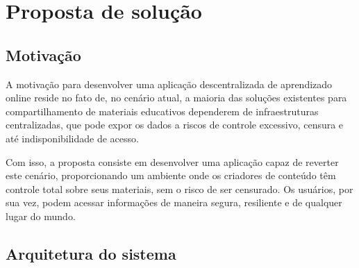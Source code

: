 \chapter[Proposta de solução]{Proposta de solução}
\label{cap:proposta}
\section[Motivação]{Motivação}
A motivação para desenvolver uma aplicação descentralizada de aprendizado online reside no fato de, no cenário atual, a maioria das soluções existentes para compartilhamento de materiais educativos dependerem de infraestruturas centralizadas, que pode expor os dados a riscos de controle excessivo, censura e até indisponibilidade de acesso.

Com isso, a proposta consiste em desenvolver uma aplicação capaz de reverter este cenário, proporcionando um ambiente onde os criadores de conteúdo têm controle total sobre seus materiais, sem o risco de ser censurado. Os usuários, por sua vez, podem acessar informações de maneira segura, resiliente e de qualquer lugar do mundo.

\section[Arquitetura do sistema]{Arquitetura do sistema}


